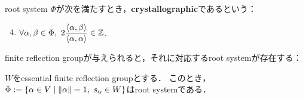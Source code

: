 \begin{definition}
  root system $\Phi$が次を満たすとき，\textbf{crystallographic}であるという：
  \begin{enumerate}[label=(\roman*)]
    \setcounter{enumi}{3}
    \item $\forall \alpha, \beta \in \Phi,\ 2 \dfrac{\left\langle \alpha, \beta \right\rangle}{\left\langle \alpha, \alpha \right\rangle} \in \mathbb{Z}$.
  \end{enumerate}
\end{definition}

finite reflection groupが与えられると，それに対応するroot systemが存在する：

\begin{proposition} \label{prop:frg_to_root}
  $W$をessential finite reflection groupとする．
  このとき，$\Phi := \set{\alpha \in V}{\norm{\alpha} = 1,\ s_\alpha \in W}$はroot systemである．
\end{proposition}
